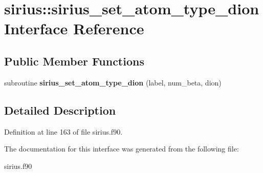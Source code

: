 \hypertarget{interfacesirius_1_1sirius__set__atom__type__dion}{}\section{sirius\+:\+:sirius\+\_\+set\+\_\+atom\+\_\+type\+\_\+dion Interface Reference}
\label{interfacesirius_1_1sirius__set__atom__type__dion}
\subsection*{Public Member Functions}
\begin{DoxyCompactItemize}
\item 
\hypertarget{interfacesirius_1_1sirius__set__atom__type__dion_ad73a0ded3e4c09da5b5f2524289b69ac}{}subroutine {\bfseries sirius\+\_\+set\+\_\+atom\+\_\+type\+\_\+dion} (label, num\+\_\+beta, dion)\label{interfacesirius_1_1sirius__set__atom__type__dion_ad73a0ded3e4c09da5b5f2524289b69ac}

\end{DoxyCompactItemize}


\subsection{Detailed Description}


Definition at line 163 of file sirius.\+f90.



The documentation for this interface was generated from the following file\+:\begin{DoxyCompactItemize}
\item 
sirius.\+f90\end{DoxyCompactItemize}
